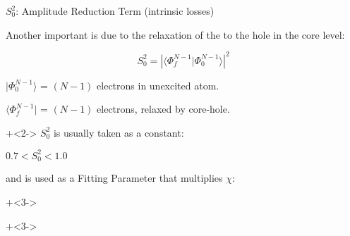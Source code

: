 \begin{slide}{$S_0^2$:  Amplitude Reduction Term (intrinsic losses)}

  Another important {} is due to the relaxation
  of the {} to the hole in the
  core level:

   \vmm
   \[
   S_0^2 =  {  |{\langle \Phi^{N-1}_f |\Phi^{N-1}_0 \rangle}|^2}
   \]

   \vmm

   ${| \Phi^{N-1}_0 \rangle }$ = $(N-1)$ electrons in unexcited atom.

   ${\langle \Phi^{N-1}_f|}$   = $(N-1)$ electrons, relaxed by core-hole.

   \vmm

   \onslide+<2->
   ${S_0^2}$ is usually taken as a constant:

  \begin{postitbox}{25mm}   $ 0.7 < S_0^2 < 1.0 $ \end{postitbox}

  and is used as a Fitting Parameter that multiplies {$\chi$}:

  \vmm  \onslide+<3->

  \begin{center}
    {}
  \end{center}

  \vmm \onslide+<3->

  \begin{postitbox}{71mm} 
  \end{postitbox}


\vfill
\end{slide}
